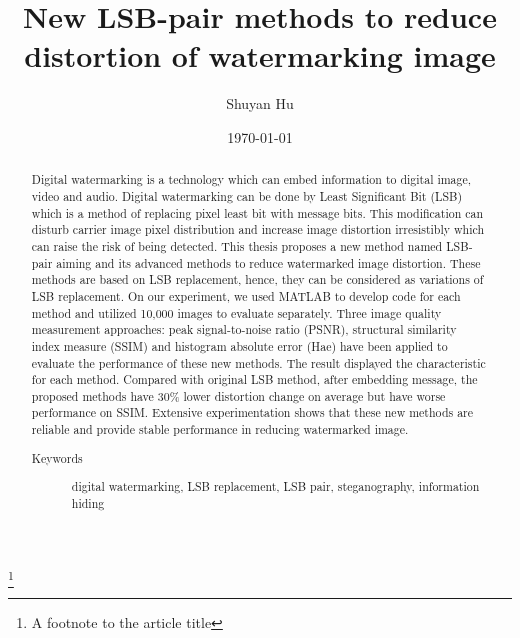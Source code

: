 \documentclass[%
    reprint,
    amsmath,amssymb,
    aps,
   ]{revtex4-1}
\begin{document}
   
   \title{New LSB-pair methods to reduce distortion of watermarking image}%
   \thanks{A footnote to the article title}%
   
   \author{Shuyan Hu}
   
   
   \date{\today}%
   
   
   \begin{abstract}
   Digital watermarking is a technology which can embed information to digital image, video and audio. Digital watermarking can be done by Least Significant Bit (LSB) which is a method of replacing pixel least bit with message bits. This modification can disturb carrier image pixel distribution and increase image distortion irresistibly which can raise the risk of being detected. This thesis proposes a new method named LSB-pair aiming and its advanced methods to reduce watermarked image distortion. These methods are based on LSB replacement, hence, they can be considered as variations of LSB replacement. On our experiment, we used MATLAB to develop code for each method and utilized 10,000 images to evaluate separately. Three image quality measurement approaches: peak signal-to-noise ratio (PSNR), structural similarity index measure (SSIM) and histogram absolute error (Hae) have been applied to evaluate the performance of these new methods. The result displayed the characteristic for each method. Compared with original LSB method, after embedding message, the proposed methods have 30\% lower distortion change on average but have worse performance on SSIM. Extensive experimentation shows that these new methods are reliable and provide stable performance in reducing watermarked image.
   
   \begin{description}
   \item[Keywords]
   digital watermarking, LSB replacement, LSB pair, steganography, information hiding
   \end{description}
   \end{abstract}
   
\end{document}
